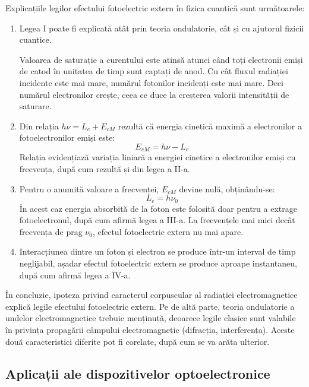 Explicațiile legilor efectului fotoelectric extern în fizica cuantică sunt
următoarele:
\begin{enumerate}
    \renewcommand{\labelenumi}{\textbf{\Roman{enumi}.}}
    \item Legea I poate fi explicată atât prin teoria ondulatorie, cât și cu ajutorul
        fizicii cuantice.

        Valoarea de saturație a curentului este atinsă atunci când toți
        electronii emiși de catod în unitatea de timp sunt captați de anod. Cu
        cât fluxul radiației incidente este mai mare, numărul fotonilor
        incidenți este mai mare.  Deci numărul electronilor crește, ceea ce
        duce la creșterea valorii intensității de saturare.

    \item Din relația \( h\nu = L_e + E_{cM} \) rezultă că energia cinetică maximă
        a electronilor a fotoelectronilor emiși este:
        \[ E_{cM} = h\nu - L_e \]
        Relația evidențiază variația liniară a energiei cinetice a electronilor emiși
        cu frecvența, după cum rezultă și din legea a II-a.
    \item Pentru o anumită valoare a frecvenței, $E_{cM}$ devine nulă, obținându-se:
        \[ L_e = h\nu_0 \]
        În acest caz energia absorbită de la foton este folosită doar pentru a extrage
        fotoelectronul, după cum afirmă legea a III-a. La frecvențele mai mici decât
        frecvența de prag $\nu_0$, efectul fotoelectric extern nu mai apare.
    \item Interacțiunea dintre un foton și electron se produce într-un interval
        de timp neglijabil, așadar efectul fotoelectric extern se produce aproape
        instantaneu, după cum afirmă legea a IV-a.
\end{enumerate}

\parbreak

În concluzie, ipoteza privind caracterul corpuscular al radiației electromagnetice
explică legile efectului fotoelectric extern. Pe de altă parte, teoria ondulatorie a
undelor electromagnetice trebuie menținută, deoarece legile clasice sunt valabile în
privința propagării câmpului electromagnetic (difracția, interferența). Aceste două
caracteristici diferite pot fi corelate, după cum se va arăta ulterior.

\subsection{Aplicații ale dispozitivelor optoelectronice}

